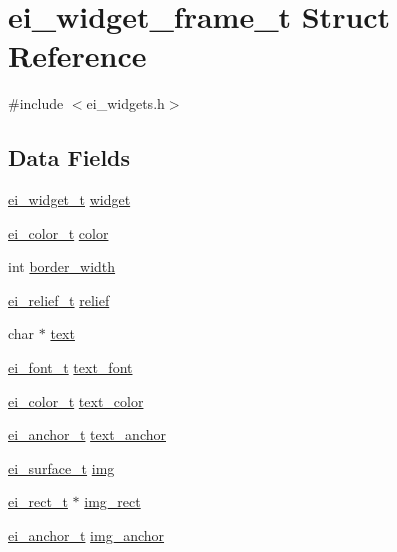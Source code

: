 \hypertarget{structei__widget__frame__t}{\section{ei\-\_\-widget\-\_\-frame\-\_\-t Struct Reference}
\label{structei__widget__frame__t}
}


{\ttfamily \#include $<$ei\-\_\-widgets.\-h$>$}

\subsection*{Data Fields}
\begin{DoxyCompactItemize}
\item 
\hyperlink{structei__widget__t}{ei\-\_\-widget\-\_\-t} \hyperlink{structei__widget__frame__t_ad375e0d41821e8f1dcf5e061d140ac0d}{widget}
\item 
\hyperlink{structei__color__t}{ei\-\_\-color\-\_\-t} \hyperlink{structei__widget__frame__t_af0d87b04713786c206022aebb27c0647}{color}
\item 
int \hyperlink{structei__widget__frame__t_aa1dbc2d7c29610d5d778afd279137f80}{border\-\_\-width}
\item 
\hyperlink{ei__types_8h_aa79a32b1d8ece0e44cfa394e870b270b}{ei\-\_\-relief\-\_\-t} \hyperlink{structei__widget__frame__t_ac5136274703286fdba8a9de420efc9e4}{relief}
\item 
char $\ast$ \hyperlink{structei__widget__frame__t_a44b96f7744db6a85b1d44195f636c37c}{text}
\item 
\hyperlink{ei__types_8h_a22c8198e4d641e4bc67bb17f9c6bcda7}{ei\-\_\-font\-\_\-t} \hyperlink{structei__widget__frame__t_a6f9e54afa5805784c3feee588832e20d}{text\-\_\-font}
\item 
\hyperlink{structei__color__t}{ei\-\_\-color\-\_\-t} \hyperlink{structei__widget__frame__t_acc7c5954f1ff3e079d40a600755f67d6}{text\-\_\-color}
\item 
\hyperlink{ei__types_8h_a3852c963af609d31d7cfcff79c4c8450}{ei\-\_\-anchor\-\_\-t} \hyperlink{structei__widget__frame__t_a3a69af5f59d337720b4f2b5af3d487bc}{text\-\_\-anchor}
\item 
\hyperlink{hw__interface_8h_ad9970ae727c438faaf09c58c5defb796}{ei\-\_\-surface\-\_\-t} \hyperlink{structei__widget__frame__t_ad50d7cdd8bc27d8f5cf12395c7f6877c}{img}
\item 
\hyperlink{structei__rect__t}{ei\-\_\-rect\-\_\-t} $\ast$ \hyperlink{structei__widget__frame__t_a84c1c35a4c8ed8c0d7f07900d8683fdf}{img\-\_\-rect}
\item 
\hyperlink{ei__types_8h_a3852c963af609d31d7cfcff79c4c8450}{ei\-\_\-anchor\-\_\-t} \hyperlink{structei__widget__frame__t_ab3fa3932c7b01d8495e1f974d02deacc}{img\-\_\-anchor}
\end{DoxyCompactItemize}


